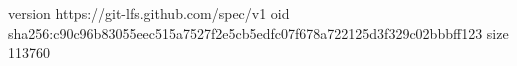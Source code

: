 version https://git-lfs.github.com/spec/v1
oid sha256:c90c96b83055eec515a7527f2e5cb5edfc07f678a722125d3f329c02bbbff123
size 113760
